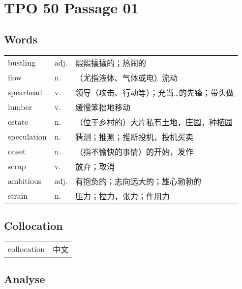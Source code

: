 \section{TPO 50 Passage 01}

\subsection{Words}

\begin{tabular}{lll}
    bustling    & adj. & 熙熙攘攘的；热闹的             \\
    flow        & n.   & （尤指液体、气体或电）流动         \\
    spearhead   & v.   & 领导（攻击、行动等）；充当…的先锋；带头做 \\
    lumber      & v.   & 缓慢笨拙地移动               \\
    estate      & n.   & （位于乡村的）大片私有土地，庄园，种植园  \\
    speculation & n.   & 猜测；推测；推断投机，投机买卖       \\
    onset       & n.   & （指不愉快的事情）的开始，发作       \\
    scrap       & v.   & 放弃；取消                 \\
    ambitious   & adj. & 有抱负的；志向远大的；雄心勃勃的      \\
    strain      & n.   & 压力；拉力，张力；作用力          \\
\end{tabular}

\subsection{Collocation}

\begin{tabular}{ll}
    collocation & 中文 \\
\end{tabular}

\subsection{Analyse}

